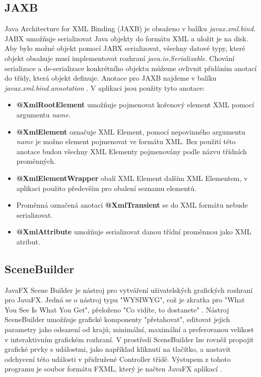 \documentclass[czech,bachelor,public,dept460,male,cpdeclaration,twoside]{diploma}
\begin{document}
\subsection{JAXB} \label{jabx}
Java Architecture for XML Binding (JAXB) je obsaženo v balíku \textit{javax.xml.bind}. JABX umožňuje serializovat Java objekty do formátu XML a uložit je na disk. Aby bylo možné objekt pomocí JABX serializovat, všechny datové typy, které objekt obsahuje musí implementovat rozhraní \textit{java.io.Serializable}. Chování serializace a de-serializace konkrétního objektu můžeme ovlivnit přidáním anotací do třídy, která objekt definuje. Anotace pro JAXB najdeme v balíku \textit{javax.xml.bind.annotation} \cite{jaxb}. V aplikaci jsou použity tyto anotace:
\begin{itemize}
  	\item \textbf{@XmlRootElement} umožňuje pojmenovat kořenový element XML pomocí argumentu \textit{name}.
  	\item \textbf{@XmlElement} označuje XML Element, pomocí nepovinného argumentu \textit{name} je možno element pojmenovat ve formátu XML. Bez použití této anotace budou všechny XML Elementy pojmenovány podle názvu třídních proměnných.
  	\item \textbf{@XmlElementWrapper} obalí XML Element dalším XML Elementem, v aplikaci použito především pro obalení seznamu elementů.
  	\item Proměnná označená anotací \textbf{@XmlTransient} se do XML formátu nebude serializovat.
  	\item \textbf{@XmlAttribute} umožňuje serializovat danou třídní proměnnou jako XML atribut.
\end{itemize}

\subsection{SceneBuilder}
JavaFX Scene Builder je nástroj pro vytváření uživatelských grafických rozhraní pro JavaFX. Jedná se o nástroj typu "WYSIWYG", což je zkratka pro "What You See Is What You Get", přeloženo "Co vidíte, to dostanete" \cite{sceneb}. Nástroj SceneBuilder umožňuje grafické komponenty "přetahovat", editovat jejich parametry jako odsazení od krajů, minimální, maximální a preferovanou velikost v interaktivním grafickém rozhraní. V prostředí SceneBuilder lze rovněž propojit grafické prvky s událostmi, jako například kliknutí na tlačítko, a nastavit odchycení této události v přidružené Controller třídě. Výstupem z tohoto programu je soubor formátu FXML, který je načten JavaFX aplikací \cite{scenebuilder}.
\end{document}
